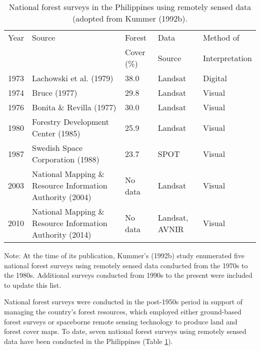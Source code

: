\begin{spacing}{1.0}
\begin{longtable}[h!]{ p{1cm} p{5.4cm} p{2.2cm} p{1.9cm} p{2.5cm} }

    \caption[National forest surveys in the Philippines using remotely sensed data.]{National forest surveys in the Philippines using remotely sensed data (adopted from Kummer (1992b).}
    \label{tab: intro-table1.1}\\
    
    	\toprule
    	Year & Source & Forest & Data & Method of\\ 
		{} & {} & Cover (\%) & Source & Interpretation\\ 
    	\midrule
    	\endhead
    	
		1973 & Lachowski et al. (1979) & 38.0 & Landsat & Digital\\
		1974 & Bruce (1977) & 29.8 & Landsat & Visual\\ 
		1976 & Bonita \& Revilla (1977) & 30.0 & Landsat & Visual\\ 
		1980 & Forestry Development Center (1985) & 25.9 & Landsat & Visual\\
		1987 & Swedish Space Corporation (1988) & 23.7 & SPOT & Visual\\
		2003 & National Mapping \& Resource Information Authority (2004) & No data & Landsat & Visual\\
		2010 & National Mapping \& Resource Information Authority (2014) & No data & Landsat, AVNIR & Visual\\ 
				
    	\bottomrule
    
\end{longtable}

	\noindent Note: At the time of its publication, Kummer's (1992b) study enumerated five national forest surveys using remotely sensed data conducted from the 1970s to the 1980s. Additional surveys conducted from 1990s to the present were included to update this list.\\ \newline
	
\end{spacing}

National forest surveys were conducted in the post-1950s period in support of managing the country's forest resources, which employed either ground-based forest surveys or spaceborne remote sensing technology to produce land and forest cover maps. To date, seven national forest surveys using remotely sensed data have been conducted in the Philippines (Table \ref{tab: intro-table1.1}).\\

